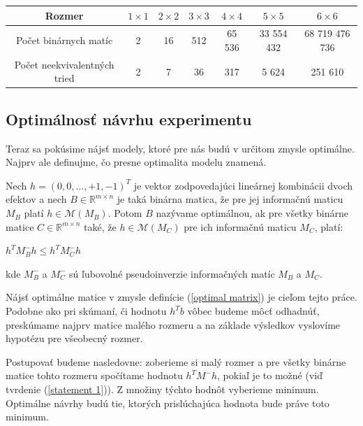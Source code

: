 \begin{center}
\begin{tabular}{ |c|c|c|c|c|c|c| }
  \hline
  Rozmer & $1 \times 1$ & $2 \times 2$ & $3 \times 3$ & $4 \times 4$ & $5 \times 5$ & $6 \times 6$ \\ \hline
  Počet binárnych matíc & 2 & 16 & 512 & 65 536 & 33 554 432 & 68 719 476 736 \\ \hline
  Počet neekvivalentných tried & 2 & 7 & 36 & 317 & 5 624 & 251 610 \\ \hline
\end{tabular}
\end{center}

\subsection{Optimálnosť návrhu experimentu}

Teraz sa pokúsime nájsť modely, ktoré pre nás budú v určitom zmysle optimálne. 
Najprv ale definujme, čo presne optimalita modelu znamená.

\begin{defin}
\label{optimal matrix definition}
Nech $h = (0, 0,\ldots , +1, -1)^T$ je vektor zodpovedajúci lineárnej kombinácii dvoch efektov
a nech $B \in \mathbb{R}^{m \times n}$ je taká binárna matica, že pre jej informačnú maticu $M_B$ platí $h \in \mathcal{M}(M_B)$.
Potom $B$ nazývame optimálnou, ak pre všetky binárne matice $C \in \mathbb{R}^{m \times n}$ také,
že $h \in \mathcal{M}(M_C)$ pre ich informačnú maticu $M_C$, platí:

\begin{center}
\label{optimal matrix}
$h^T M_{B}^- h \leq h^T M_{C}^- h$
\end{center}
kde $M_{B}^-$ a $M_{C}^-$ sú ľubovolné pseudoinverzie informačných matíc $M_B$ a $M_C$.

\end{defin}

Nájsť optimálne matice v zmysle definície (\ref{optimal matrix}) je cieľom tejto práce. 
Podobne ako pri skúmaní, či hodnotu $h^T b$ vôbec budeme môcť odhadnúť, 
preskúmame najprv matice malého rozmeru a na základe výsledkov vyslovíme hypotézu pre všeobecný rozmer.

Postupovať budeme nasledovne: zoberieme si malý rozmer a pre všetky binárne matice tohto rozmeru spočítame hodnotu $h^T M^- h$, 
pokiaľ je to možné (viď tvrdenie (\ref{statement 1})). Z množiny týchto hodnôt vyberieme minimum. 
Optimálne návrhy budú tie, ktorých prislúchajúca hodnota bude práve toto minimum.

